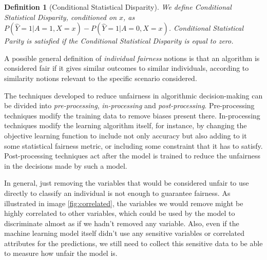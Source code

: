 \documentclass[conference]{IEEEtran}
\newtheorem{definition}{Definition}
\begin{document}
\begin{definition}[Conditional Statistical Disparity]\label{def:CSD} We define \emph{Conditional Statistical Disparity}, conditioned on $x$, as $P(\hat Y = 1| A = 1, X = x) - P(\hat Y = 1| A = 0, X = x)$. Conditional Statistical \emph{Parity} is \emph{satisfied} if the Conditional Statistical Disparity is equal to zero.
\end{definition}

A possible general definition of \emph{individual fairness} notions is that an algorithm is considered fair if it gives similar outcomes to similar individuals, according to similarity notions relevant to the specific scenario considered.

The techniques developed to reduce unfairness in algorithmic decision-making can be divided into \emph{pre-processing}, \emph{in-processing} and \emph{post-processing}. Pre-processing techniques modify the training data to remove biases present there. In-processing techniques modify the learning algorithm itself, for instance, by changing the objective learning function to include not only accuracy but also adding to it some statistical fairness metric, or including some constraint that it has to satisfy. Post-processing techniques act after the model is trained to reduce the unfairness in the decisions made by such a model.

In general, just removing the variables that would be considered unfair to use directly to classify an individual is not enough to guarantee fairness. As illustrated in image \ref{fig:correlated}, the variables we would remove might be highly correlated to other variables, which could be used by the model to discriminate almost as if we hadn't removed any variable. Also, even if the machine learning model itself didn't use any sensitive variables or correlated attributes for the predictions, we still need to collect this sensitive data to be able to measure how unfair the model is.
\end{document}
